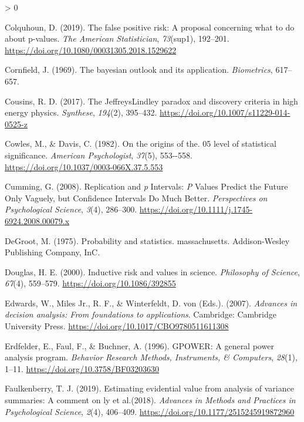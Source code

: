 \documentclass[
  english,
  ,man, a4paper,floatsintext]{apa6}
\newlength{\cslhangindent}
\newenvironment{CSLReferences}[2] %
 {%
  \setlength{\parindent}{0pt}
  \ifodd #1 \everypar{\setlength{\hangindent}{\cslhangindent}}\ignorespaces\fi
  \ifnum #2 > 0
  \setlength{\parskip}{#2\baselineskip}
  \fi
 }%
 {}
\begin{document}
\begin{CSLReferences}{1}{0}
\leavevmode\hypertarget{ref-colquhoun_false_2019}{}%
Colquhoun, D. (2019). The false positive risk: A proposal concerning what to do about p-values. \emph{The American Statistician}, \emph{73}(sup1), 192--201. \url{https://doi.org/10.1080/00031305.2018.1529622}

\leavevmode\hypertarget{ref-cornfield1969bayesian}{}%
Cornfield, J. (1969). The bayesian outlook and its application. \emph{Biometrics}, 617--657.

\leavevmode\hypertarget{ref-cousins_jeffreyslindley_2017}{}%
Cousins, R. D. (2017). The {Jeffreys}{{Lindley}} paradox and discovery criteria in high energy physics. \emph{Synthese}, \emph{194}(2), 395--432. \url{https://doi.org/10.1007/s11229-014-0525-z}

\leavevmode\hypertarget{ref-cowles_origins_1982}{}%
Cowles, M., \& Davis, C. (1982). On the origins of the. 05 level of statistical significance. \emph{American Psychologist}, \emph{37}(5), 553-\/-558. \url{https://doi.org/10.1037/0003-066X.37.5.553}

\leavevmode\hypertarget{ref-cumming_replication_2008}{}%
Cumming, G. (2008). Replication and {\emph{p}} {Intervals}: {\emph{P}} {Values Predict} the {Future Only Vaguely}, but {Confidence Intervals Do Much Better}. \emph{Perspectives on Psychological Science}, \emph{3}(4), 286--300. \url{https://doi.org/10.1111/j.1745-6924.2008.00079.x}

\leavevmode\hypertarget{ref-degroot1975probability}{}%
DeGroot, M. (1975). Probability and statistics. massachusetts. Addison-Wesley Publishing Company, InC.

\leavevmode\hypertarget{ref-douglas_inductive_2000}{}%
Douglas, H. E. (2000). Inductive risk and values in science. \emph{Philosophy of Science}, \emph{67}(4), 559--579. \url{https://doi.org/10.1086/392855}

\leavevmode\hypertarget{ref-edwards_advances_2007}{}%
Edwards, W., Miles Jr., R. F., \& Winterfeldt, D. von (Eds.). (2007). \emph{Advances in decision analysis: {From} foundations to applications}. Cambridge: Cambridge University Press. \url{https://doi.org/10.1017/CBO9780511611308}

\leavevmode\hypertarget{ref-erdfelder_gpower_1996}{}%
Erdfelder, E., Faul, F., \& Buchner, A. (1996). {GPOWER}: {A} general power analysis program. \emph{Behavior Research Methods, Instruments, \& Computers}, \emph{28}(1), 1--11. \url{https://doi.org/10.3758/BF03203630}

\leavevmode\hypertarget{ref-faulkenberry2019estimating}{}%
Faulkenberry, T. J. (2019). Estimating evidential value from analysis of variance summaries: A comment on ly et al.(2018). \emph{Advances in Methods and Practices in Psychological Science}, \emph{2}(4), 406--409. \url{https://doi.org/10.1177/2515245919872960}


\end{CSLReferences}
\end{document}
